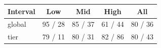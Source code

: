 \begin{tabular}{lcccc}
\toprule
Interval & Low & Mid & High & All \\
\midrule
global & 95 / 28 & 85 / 37 & 61 / 44 & 80 / 36 \\
tier & 79 / 11 & 80 / 31 & 82 / 86 & 80 / 43 \\
\bottomrule
\end{tabular}
